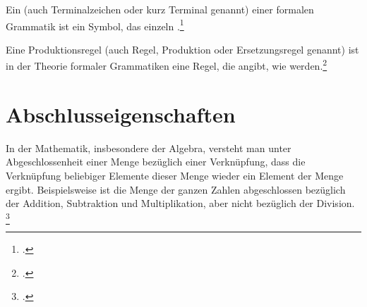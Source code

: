 \documentclass{lehramt-informatik-haupt}
\begin{document}
%

Ein  (auch Terminalzeichen oder kurz Terminal
genannt) einer formalen Grammatik ist ein Symbol, das einzeln
.\footcite{wiki:terminal}

Eine Produktionsregel (auch Regel, Produktion oder Ersetzungsregel
genannt) ist in der Theorie formaler Grammatiken eine Regel, die angibt,
wie  werden.\footcite{wiki:produktionsregel}

%

\section{Abschlusseigenschaften}

In der Mathematik, insbesondere der Algebra, versteht man unter
Abgeschlossenheit einer Menge bezüglich einer Verknüpfung, dass die
Verknüpfung beliebiger Elemente dieser Menge wieder ein Element der
Menge ergibt. Beispielsweise ist die Menge der ganzen Zahlen
abgeschlossen bezüglich der Addition, Subtraktion und Multiplikation,
aber nicht bezüglich der Division.
\footcite{wiki:abgeschlossenheit}
\end{document}
